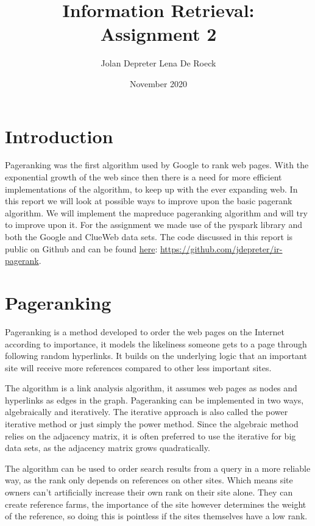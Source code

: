 \documentclass{article}
\title{Information Retrieval:\\ Assignment 2}
\author{Jolan Depreter \cr Lena De Roeck }
\date{November 2020}
\begin{document}
\maketitle



\tableofcontents
\pagebreak

\section{Introduction}
Pageranking was the first algorithm used by Google to rank web pages. With the exponential growth of the web since then there is a need for more efficient implementations of the algorithm, to keep up with the ever expanding web. In this report we will look at possible ways to improve upon the basic pagerank algorithm. We will implement the mapreduce pageranking algorithm and will try to improve upon it. For the assignment we made use of the pyspark library and both the Google and ClueWeb data sets.
The code discussed in this report is public on Github and can be found \href{https://github.com/jdepreter/ir-pagerank}{here}:
\url{https://github.com/jdepreter/ir-pagerank}.

\section{Pageranking}
Pageranking is a method developed to order the web pages on the Internet according to importance, it models the likeliness someone gets to a page through following random hyperlinks. It builds on the underlying logic that an important site will receive more references compared to other less important sites. 

The algorithm is a link analysis algorithm, it assumes web pages as nodes and hyperlinks as edges in the graph. Pageranking can be implemented in two ways, algebraically and iteratively. The iterative approach is also called the power iterative method or just simply the power method. Since the algebraic method relies on the adjacency matrix, it is often preferred to use the iterative for big data sets, as the adjacency matrix grows quadratically.

The algorithm can be used to order search results from a query in a more reliable way, as the rank only depends on references on other sites. Which means site owners can't artificially increase their own rank on their site alone. They can create reference farms, the importance of the site however determines the weight of the reference, so doing this is pointless if the sites themselves have a low rank.
\end{document}
